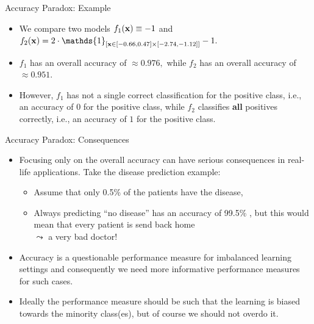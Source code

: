 \documentclass[11pt,compress,t,notes=noshow, xcolor=table]{beamer}
\begin{document}
\begin{vbframe}{Accuracy Paradox: Example}
\begin{itemize}
\begin{minipage}{0.35\textwidth}
\begin{center}
		\end{center}
		\end{minipage}
%	
	\item We compare two models $f_1(\mathbf{x}) \equiv -1$ and $f_2(\xv) = 2 \cdot \mathds{1}_{[ \xv \in [-0.66,0.47]\times [-2.74,-1.12] ]} -1.$
%	
	\item $f_1$ has an overall accuracy of $\approx 0.976,$ while $f_2$ has an overall accuracy of $\approx 0.951.$
%	
	\item However, $f_1$ has not a single correct classification for the positive class, i.e., an accuracy of $0$ for the positive class, while $f_2$ classifies \textbf{all} positives correctly, i.e., an accuracy of $1$ for the positive class.
%	
	\end{itemize}
\end{vbframe} 



\begin{vbframe}{Accuracy Paradox: Consequences}
	\small
	\begin{itemize}
		\item Focusing only on the overall accuracy can have serious consequences in real-life applications. Take the disease prediction example:
%		
		\begin{itemize}
			\small
%			
			\item Assume that only 0.5\% of the patients have the disease,
%			
			\item Always predicting ``no disease'' has an accuracy of 99.5\% , but this would mean that every patient is send back home \\
%			
			$\leadsto$ a very bad doctor!
%			
		\end{itemize}
		\item Accuracy is a questionable performance measure for imbalanced learning settings and consequently we need more informative performance measures for such cases.
		\item Ideally the performance measure should be such that the learning is biased towards the minority class(es), but of course we should not overdo it.
%		
	\end{itemize}
\end{vbframe} 
\end{document}

